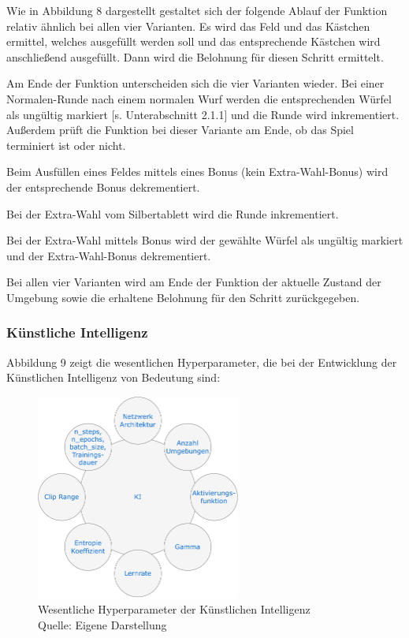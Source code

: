 Wie in Abbildung 8 dargestellt gestaltet sich der folgende Ablauf der Funktion relativ ähnlich bei allen vier Varianten. Es wird das Feld und das Kästchen ermittel, welches ausgefüllt werden soll und das entsprechende Kästchen wird anschließend ausgefüllt. Dann wird die Belohnung für diesen Schritt ermittelt.

Am Ende der Funktion unterscheiden sich die vier Varianten wieder. Bei einer Normalen-Runde nach einem normalen Wurf werden die entsprechenden Würfel als ungültig markiert [s. Unterabschnitt 2.1.1] und die Runde wird inkrementiert. Außerdem prüft die Funktion bei dieser Variante am Ende, ob das Spiel terminiert ist oder nicht.

Beim Ausfüllen eines Feldes mittels eines Bonus (kein Extra-Wahl-Bonus) wird der entsprechende Bonus dekrementiert.

Bei der Extra-Wahl vom Silbertablett wird die Runde inkrementiert.

Bei der Extra-Wahl mittels Bonus wird der gewählte Würfel als ungültig markiert und der Extra-Wahl-Bonus dekrementiert.

Bei allen vier Varianten wird am Ende der Funktion der aktuelle Zustand der Umgebung sowie die erhaltene Belohnung für den Schritt zurückgegeben.

\subsubsection{Künstliche Intelligenz}
Abbildung 9 zeigt die wesentlichen Hyperparameter, die bei der Entwicklung der Künstlichen Intelligenz von Bedeutung sind:
\nopagebreak
\begin{figure}[H]
	\centering
	\includegraphics[width=0.6\textwidth]{Bilder/KI} 
	\caption[Wesentliche Hyperparameter der Künstlichen Intelligenz]{Wesentliche Hyperparameter der Künstlichen Intelligenz\\ Quelle: Eigene Darstellung}
\end{figure}

